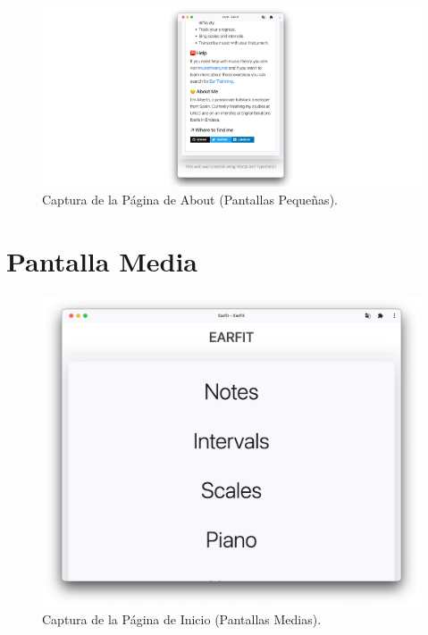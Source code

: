 \documentclass[12pt,twoside,titlepage]{report}
\begin{document}
\begin{figure}[H]
    \centering
    \includegraphics[scale=0.7]{Capturas Earfit/Movil/Movil4}
    \caption{Captura de la Página de About (Pantallas Pequeñas).}
    \label{fig:Movil4}
\end{figure}

\section{Pantalla Media}

\begin{figure}[H]
    \centering
    \includegraphics[scale=0.3]{Capturas Earfit/Tablet/Menu}
    \caption{Captura de la Página de Inicio (Pantallas Medias).}
    \label{fig:TabletMenu}
\end{figure}
\end{document}
